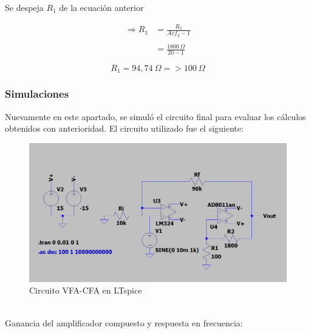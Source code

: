 \documentclass[a4paper,12pt]{article}
\begin{document}
\vspace{0,2cm}
\hspace{1mm} Se despeja $ R_1 $ de la ecuación anterior

\begin{align}
   \Longrightarrow R_1 &= \frac{R_2}{Avf_2 - 1} \label{eq:primera} \\
   \nonumber
   \\ 
                       &= \frac{1800~\Omega}{20 - 1}
\end{align}

\begin{equation}
    \boxed{
    R_1 = 94,74~\Omega=>100~\Omega
    }
\end{equation}

\bigskip
\subsubsection{Simulaciones}
\vspace{0,2cm}
\hspace{1mm}Nuevamente en este apartado, se simuló el circuito final para evaluar los cálculos obtenidos con anterioridad. El circuito utilizado fue el siguiente:
\begin{figure}[h]
    \centering
    \includegraphics[width=1\linewidth]{CircuitoVFA_CFA_I.png}
    \caption{Circuito VFA-CFA en LTspice}
    \label{fig:enter-label}
\end{figure}
\\
\hspace{1mm}Ganancia del amplificador compuesto y respuesta en frecuencia:
\end{document}
